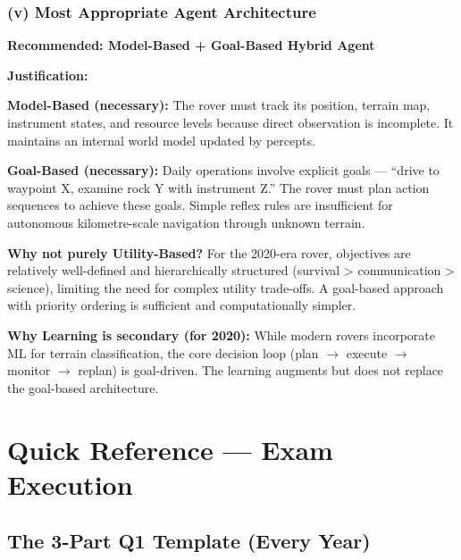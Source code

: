 \documentclass[12pt, a4paper]{article}
\newenvironment{answerbox}{\begin{mdframed}[style=answerframe]}{\end{mdframed}}
\begin{document}
\subsubsection*{(v) Most Appropriate Agent Architecture}

\begin{answerbox}
\textbf{Recommended: Model-Based + Goal-Based Hybrid Agent}

\noindent\textbf{Justification:}
\begin{keypoints}
  \item \textbf{Model-Based (necessary):} The rover must track its position, terrain map, instrument states, and resource levels because direct observation is incomplete. It maintains an internal world model updated by percepts.
  \item \textbf{Goal-Based (necessary):} Daily operations involve explicit goals — ``drive to waypoint X, examine rock Y with instrument Z.'' The rover must plan action sequences to achieve these goals. Simple reflex rules are insufficient for autonomous kilometre-scale navigation through unknown terrain.
  \item \textbf{Why not purely Utility-Based?} For the 2020-era rover, objectives are relatively well-defined and hierarchically structured (survival > communication > science), limiting the need for complex utility trade-offs. A goal-based approach with priority ordering is sufficient and computationally simpler.
  \item \textbf{Why Learning is secondary (for 2020):} While modern rovers incorporate ML for terrain classification, the core decision loop (plan $\to$ execute $\to$ monitor $\to$ replan) is goal-driven. The learning augments but does not replace the goal-based architecture.
\end{keypoints}
\end{answerbox}

\newpage

\section{Quick Reference — Exam Execution}

\subsection*{The 3-Part Q1 Template (Every Year)}
\end{document}
